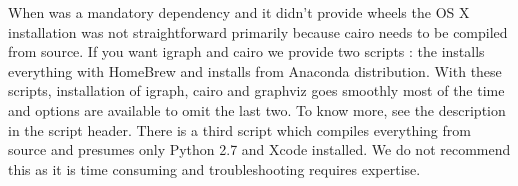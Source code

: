 \documentclass[letterpaper,10pt,english]{sphinxmanual}
\begin{document}
When  was a mandatory dependency and it didn’t provide wheels
the OS X installation was not straightforward primarily because cairo needs to
be compiled from source. If you want igraph and cairo we provide two scripts
: the  installs everything with HomeBrew and
 installs from Anaconda distribution. With these
scripts, installation of igraph, cairo and graphviz goes smoothly most of the
time and options are available to omit the last two. To know more, see
the description in the script header. There is a third script
 which compiles everything from source and presumes
only Python 2.7 and Xcode installed. We do not recommend this as it is time
consuming and troubleshooting requires expertise.
\end{document}
